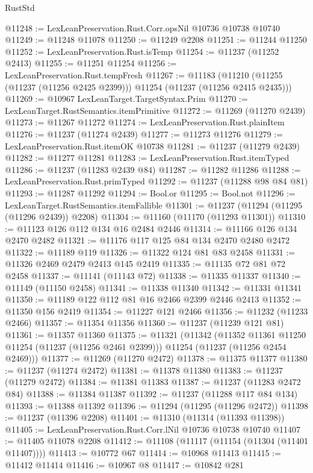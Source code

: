 \begin{lexlean}{RustStd}
\begin{coremodule}
@11248 := LexLeanPreservation.Rust.Corr.opsNil @10736 @10738 @10740
@11249 := @11248 @11078
@11250 := @11249 @2208
@11251 := @11244 @11250
@11252 := LexLeanPreservation.Rust.isTemp
@11254 := @11237 (@11252 @2413)
@11255 := @11251 @11254
@11256 := LexLeanPreservation.Rust.tempFresh
@11267 := @11183
    (@11210 (@11255 (@11237 (@11256 @2425 @2399))) @11254 (@11237 (@11256 @2415 @2435)))
@11269 := @10967 LexLeanTarget.TargetSyntax.Prim
@11270 := LexLeanTarget.RustSemantics.itemPrimitive
@11272 := @11269 (@11270 @2439)
@11273 := @11267 @11272
@11274 := LexLeanPreservation.Rust.plainItem
@11276 := @11237 (@11274 @2439)
@11277 := @11273 @11276
@11279 := LexLeanPreservation.Rust.itemOK @10738
@11281 := @11237 (@11279 @2439)
@11282 := @11277 @11281
@11283 := LexLeanPreservation.Rust.itemTyped
@11286 := @11237 (@11283 @2439 @84)
@11287 := @11282 @11286
@11288 := LexLeanPreservation.Rust.primTyped
@11292 := @11237 (@11288 @98 @84 @81)
@11293 := @11287 @11292
@11294 := Bool.or
@11295 := Bool.not
@11296 := LexLeanTarget.RustSemantics.itemFallible
@11301 := @11237 (@11294 (@11295 (@11296 @2439)) @2208)
@11304 := @11160 (@11170 (@11293 @11301))
@11310 := @11123 @126 @112 @134 @16 @2484 @2446
@11314 := @11166 @126 @134 @2470 @2482
@11321 := @11176 @117 @125 @84 @134 @2470 @2480 @2472
@11322 := @11189 @119
@11326 := @11322 @124 @81 @83 @2458
@11331 := @11326 @2469 @2479 @2413 @145 @2419
@11335 := @11135 @72 @81 @72 @2458
@11337 := @11141 (@11143 @72)
@11338 := @11335 @11337
@11340 := @11149 (@11150 @2458)
@11341 := @11338 @11340
@11342 := @11331 @11341
@11350 := @11189 @122 @112 @81 @16 @2466 @2399 @2446 @2413
@11352 := @11350 @156 @2419
@11354 := @11227 @121 @2466
@11356 := @11232 (@11233 @2466)
@11357 := @11354 @11356
@11360 := @11237 (@11239 @121 @81)
@11361 := @11357 @11360
@11375 := @11321
    (@11342
      (@11352 @11361 @11250 @11254 (@11237 (@11256 @2461 @2399)))
      @11254
      (@11237 (@11256 @2454 @2469)))
@11377 := @11269 (@11270 @2472)
@11378 := @11375 @11377
@11380 := @11237 (@11274 @2472)
@11381 := @11378 @11380
@11383 := @11237 (@11279 @2472)
@11384 := @11381 @11383
@11387 := @11237 (@11283 @2472 @84)
@11388 := @11384 @11387
@11392 := @11237 (@11288 @117 @84 @134)
@11393 := @11388 @11392
@11396 := @11294 (@11295 (@11296 @2472))
@11398 := @11237 (@11396 @2208)
@11401 := @11310 (@11314 (@11393 @11398))
@11405 := LexLeanPreservation.Rust.Corr.lNil @10736 @10738 @10740
@11407 := @11405 @11078 @2208
@11412 := @11108 (@11117 (@11154 (@11304 (@11401 @11407))))
@11413 := @10772 @67
@11414 := @10968 @11413
@11415 := @11412 @11414
@11416 := @10967 @8
@11417 := @10842 @281

\end{coremodule}
\end{lexlean}
